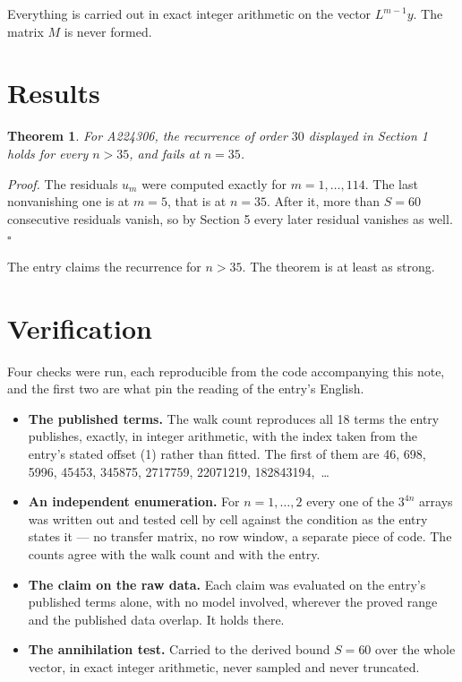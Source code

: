 \documentclass[11pt]{article}
\newtheorem{theorem}{Theorem}
\theoremstyle{definition}
\begin{document}
Everything is carried out in exact integer arithmetic on the vector $L^{m-1}y$. The matrix $M$ is never formed.

\section{Results}

\begin{theorem} For A224306, the recurrence of order $30$ displayed in Section 1 holds for every $n > 35$, and fails at $n = 35$.\end{theorem}

{\itshape Proof.} The residuals $u_m$ were computed exactly for $m = 1,\dots,114$. The last nonvanishing one is at $m = 5$, that is at $n = 35$. After it, more than $S = 60$ consecutive residuals vanish, so by Section 5 every later residual vanishes as well. $\square$

The entry claims the recurrence for $n > 35$. The theorem is at least as strong.

\section{Verification}

Four checks were run, each reproducible from the code accompanying this note, and the first two are what pin the reading of the entry's English.

\begin{itemize}

\item {\bfseries The published terms.} The walk count reproduces all 18 terms the entry publishes, exactly, in integer arithmetic, with the index taken from the entry's stated offset (1) rather than fitted. The first of them are 46, 698, 5996, 45453, 345875, 2717759, 22071219, 182843194,~\dots

\item {\bfseries An independent enumeration.} For $n = 1,\dots,2$ every one of the $3^{4n}$ arrays was written out and tested cell by cell against the condition as the entry states it --- no transfer matrix, no row window, a separate piece of code. The counts agree with the walk count and with the entry.

\item {\bfseries The claim on the raw data.} Each claim was evaluated on the entry's published terms alone, with no model involved, wherever the proved range and the published data overlap. It holds there.

\item {\bfseries The annihilation test.} Carried to the derived bound $S = 60$ over the whole vector, in exact integer arithmetic, never sampled and never truncated.

\end{itemize}
\end{document}
